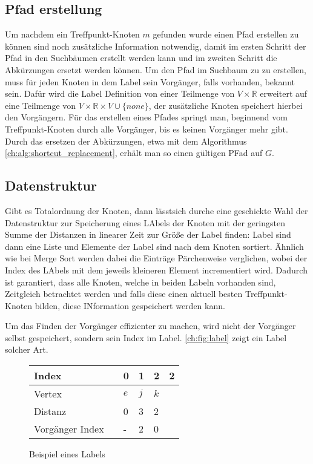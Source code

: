 \subsection{Pfad erstellung}

Um nachdem ein Treffpunkt-Knoten $m$ gefunden wurde einen Pfad erstellen zu können sind noch zusätzliche Information notwendig, damit im ersten Schritt der Pfad in den Suchbäumen erstellt werden kann und im zweiten Schritt die Abkürzungen ersetzt werden können.
Um den Pfad im Suchbaum zu zu erstellen, muss für jeden Knoten in dem Label sein Vorgänger, falls vorhanden, bekannt sein.
Dafür wird die Label Definition von einer Teilmenge von $V \times \mathbb{R}$ erweitert auf eine Teilmenge von $V \times \mathbb{R} \times V \cup \{ none \} $, der zusätzliche Knoten speichert hierbei den Vorgängern.
Für das erstellen eines Pfades springt man, beginnend vom Treffpunkt-Knoten durch alle Vorgänger, bis es keinen Vorgänger mehr gibt.
Durch das ersetzen der Abkürzungen, etwa mit dem Algorithmus \ref{ch:alg:shortcut_replacement}, erhält man so einen gültigen PFad auf $G$.

\subsection{Datenstruktur}

Gibt es Totalordnung der Knoten, dann lässtsich durche eine geschickte Wahl der Datenstruktur zur Speicherung eines LAbels der Knoten mit der geringsten Summe der Distanzen in linearer Zeit zur Größe der Label finden:
Label sind dann eine Liste und Elemente der Label sind nach dem Knoten sortiert.
Ähnlich wie bei Merge Sort werden dabei die Einträge Pärchenweise verglichen, wobei der Index des LAbels mit dem jeweils kleineren Element incrementiert wird.
Dadurch ist garantiert, dass alle Knoten, welche in beiden Labeln vorhanden sind, Zeitgleich betrachtet werden und falls diese einen aktuell besten Treffpunkt-Knoten bilden, diese INformation gespeichert werden kann.

Um das Finden der Vorgänger effizienter zu machen, wird nicht der Vorgänger selbst gespeichert, sondern sein Index im Label.
\autoref{ch:fig:label} zeigt ein Label solcher Art.

\begin{figure}[ht]
    \centering
    \begin{tabular}{@{}llllll@{}}
        \toprule
        Index           &  & 0   & 1   & 2   & 2 \\ \midrule
        Vertex          &  & $e$ & $j$ & $k$ &   \\
        Distanz         &  & 0   & 3   & 2   &   \\
        Vorgänger Index &  & -   & 2   & 0   &   \\ \bottomrule
    \end{tabular}
    \caption{Beispiel eines Labels}
    \label{ch:fig:label}
\end{figure}

